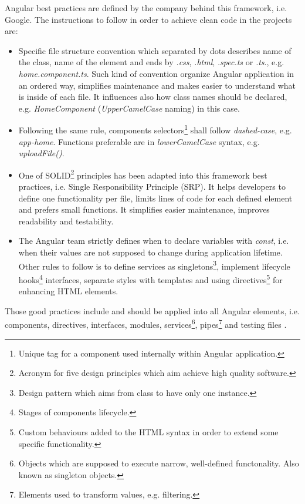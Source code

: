 \documentclass{article} %
\begin{document}
Angular best practices are defined by the company behind this framework, i.e. Google. The instructions to follow in order to achieve clean code in the projects are:
\begin{itemize}
    \item Specific file structure convention which separated by dots describes name of the class, name of the element and ends by \textit{.css}, \textit{.html}, \textit{.spec.ts} or \textit{.ts}., e.g. \textit{home.component.ts}. Such kind of convention organize Angular application in an ordered way, simplifies maintenance and makes easier to understand what is inside of each file. It influences also how class names should be declared, e.g. \textit{HomeComponent} (\textit{UpperCamelCase} naming) in this case.
    \item Following the same rule, components selectors\footnote{Unique tag for a component used internally within Angular application.} shall follow \textit{dashed-case}, e.g. \textit{app-home}. Functions preferable are in \textit{lowerCamelCase} syntax, e.g. \textit{uploadFile()}.
    \item One of SOLID\footnote{Acronym for five design principles which aim achieve high quality software.} principles has been adapted into this framework best practices, i.e. Single Responsibility Principle (SRP). It helps developers to define one functionality per file, limits lines of code for each defined element and prefers small functions. It simplifies easier maintenance, improves readability and testability.
    \item The Angular team strictly defines when to declare variables with \textit{const}, i.e. when their values are not supposed to change during application lifetime. Other rules to follow is to define services as singletons\footnote{Design pattern which aims from class to have only one instance.}, implement lifecycle hooks\footnote{Stages of components lifecycle.} interfaces, separate styles with templates and using directives\footnote{Custom behaviours added to the HTML syntax in order to extend some specific functionality.} for enhancing HTML elements.
\end{itemize}
Those good practices include and should be applied into all Angular elements, i.e. components, directives, interfaces, modules, services\footnote{Objects which are supposed to execute narrow, well-defined functonality. Also known as singleton objects.}, pipes\footnote{Elements used to transform values, e.g. filtering.} and testing files \cite{bib:angular_best_practices}.\\
\end{document}

